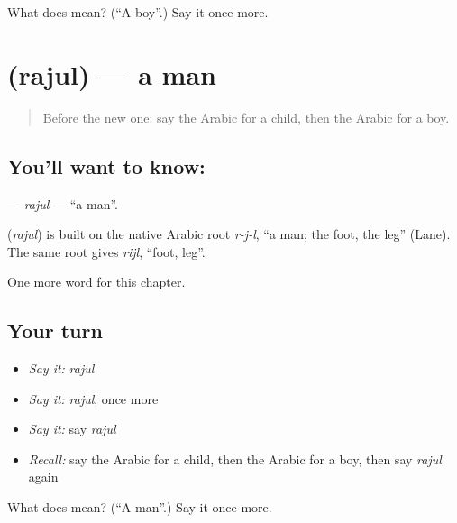 \begin{tcolorbox}[breakable,colback=teal!4,colframe=teal!35!black,title={Before you move on}]
What does  mean? (\textquotedblleft{}A boy\textquotedblright{}.) Say it once more.
\end{tcolorbox}
\section[\texorpdfstring{\ar{رجل} (rajul)}{رجل (rajul)}]{ (rajul) — a man}

\label{lesson:AR-C56-rajul}



\begin{quote}
Before the new one: say the Arabic for a child, then the Arabic for a boy.
\end{quote}

\subsection*{You'll want to know: }
\textbf{} — \emph{rajul} — \textquotedblleft{}a man\textquotedblright{}.

\begin{cousinweb}
\textbf{} (\emph{rajul}) is built on the native Arabic root \emph{r-j-l}, \textquotedblleft{}a man; the foot, the leg\textquotedblright{} (Lane). The same root gives \emph{rijl}, \textquotedblleft{}foot, leg\textquotedblright{}.
\end{cousinweb}

\begin{grammarlens}[title={What you've built}]
One more word for this chapter.
\end{grammarlens}

\subsection*{Your turn}
\begin{itemize}
\raggedright
  \item \emph{Say it:} \emph{rajul}
  \item \emph{Say it:} \emph{rajul}, once more
  \item \emph{Say it:} say \emph{rajul}
  \item \emph{Recall:} say the Arabic for a child, then the Arabic for a boy, then say \emph{rajul} again
\end{itemize}

\begin{tcolorbox}[breakable,colback=teal!4,colframe=teal!35!black,title={Before you move on}]
What does  mean? (\textquotedblleft{}A man\textquotedblright{}.) Say it once more.
\end{tcolorbox}
